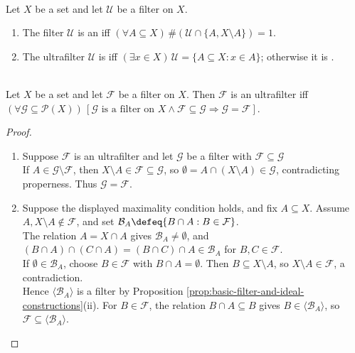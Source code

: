 \begin{definition} \label{def:ultrafilter-and-principality} \\
Let $X$ be a set and let $\mathcal{U}$ be a filter on $X$.
\begin{enumerate}[label=(\roman*)]
\setlength{\itemsep}{0pt}
\item The filter $\mathcal{U}$ is an  iff $(\forall A\subseteq X)\,\#(\mathcal{U}\cap\{A,X\setminus A\})=1$.
\item The ultrafilter $\mathcal{U}$ is  iff $(\exists x\in X)\,\mathcal{U}=\{A\subseteq X:x\in A\}$; otherwise it is .
\end{enumerate}
\end{definition}

\begin{theorem} \label{thm:ultrafilters-are-maximal-filters} \\
Let $X$ be a set and let $\mathcal{F}$ be a filter on $X$. Then $\mathcal{F}$ is an ultrafilter iff $(\forall\mathcal{G}\subseteq\mathcal{P}(X))\,[\mathcal{G}\text{ is a filter on }X\land\mathcal{F}\subseteq\mathcal{G}\Rightarrow\mathcal{G}=\mathcal{F}]$.
\begin{proof}
\begin{enumerate}[label=\roman*.]
\setlength{\itemsep}{0pt}
\item[$(\Rightarrow)$] Suppose $\mathcal{F}$ is an ultrafilter and let $\mathcal{G}$ be a filter with $\mathcal{F}\subseteq\mathcal{G}$\\
If $A\in\mathcal{G}\setminus\mathcal{F}$, then $X\setminus A\in\mathcal{F}\subseteq\mathcal{G}$, so $\emptyset=A\cap(X\setminus A)\in\mathcal{G}$, contradicting properness. Thus $\mathcal{G}=\mathcal{F}$.
\item[$(\Leftarrow)$] Suppose the displayed maximality condition holds, and fix $A\subseteq X$. Assume $A,X\setminus A\notin\mathcal{F}$, and set $\mathcal{B}_A\defeq\{B\cap A:B\in\mathcal{F}\}$.\\
The relation $A=X\cap A$ gives $\mathcal{B}_A\neq\emptyset$, and $(B\cap A)\cap(C\cap A)=(B\cap C)\cap A\in\mathcal{B}_A$ for $B,C\in\mathcal{F}$.\\
If $\emptyset\in\mathcal{B}_A$, choose $B\in\mathcal{F}$ with $B\cap A=\emptyset$. Then $B\subseteq X\setminus A$, so $X\setminus A\in\mathcal{F}$, a contradiction.\\
Hence $\langle\mathcal{B}_A\rangle$ is a filter by Proposition \ref{prop:basic-filter-and-ideal-constructions}(ii). For $B\in\mathcal{F}$, the relation $B\cap A\subseteq B$ gives $B\in\langle\mathcal{B}_A\rangle$, so $\mathcal{F}\subseteq\langle\mathcal{B}_A\rangle$.\\

\end{enumerate}
\end{proof}
\end{theorem}
